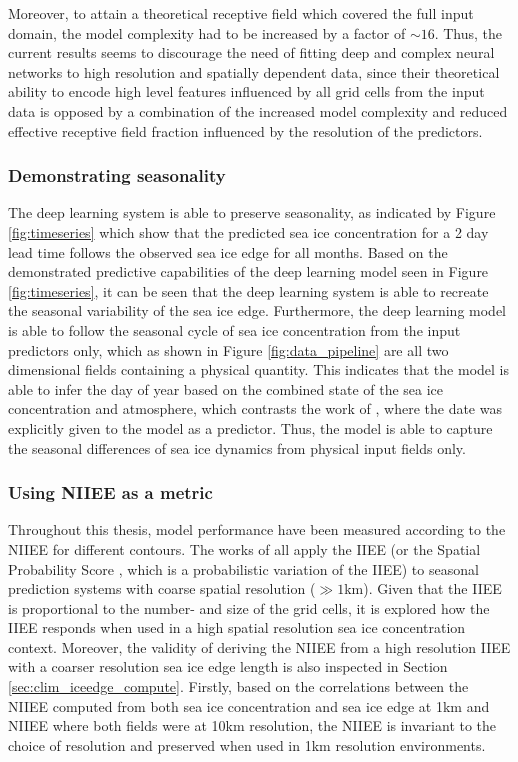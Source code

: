 \documentclass[../main/thesis]{subfiles}
\begin{document}
Moreover, to attain a theoretical receptive field which covered the full input domain, the model complexity had to be increased by a factor of $\sim 16$. Thus, the current results seems to discourage the need of fitting deep and complex neural networks to high resolution and spatially dependent data, since their theoretical ability to encode high level features influenced by all grid cells from the input data is opposed by a combination of the increased model complexity and reduced effective receptive field fraction influenced by the resolution of the predictors.

\subsubsection{Demonstrating seasonality}
\label{sec:demonstrate_seasonality}
The deep learning system is able to preserve seasonality, as indicated by Figure \ref{fig:timeseries} which show that the predicted sea ice concentration for a 2 day lead time follows the observed sea ice edge for all months. Based on the demonstrated predictive capabilities of the deep learning model seen in Figure \ref{fig:timeseries}, it can be seen that the deep learning system is able to recreate the seasonal variability of the sea ice edge. Furthermore, the deep learning model is able to follow the seasonal cycle of sea ice concentration from the input predictors only, which as shown in Figure \ref{fig:data_pipeline} are all two dimensional fields containing a physical quantity. This indicates that the model is able to infer the day of year based on the combined state of the sea ice concentration and atmosphere, which contrasts the work of \citet{Grigoryev2022}, where the date was explicitly given to the model as a predictor. Thus, the model is able to capture the seasonal differences of sea ice dynamics from physical input fields only.

\subsubsection{Using NIIEE as a metric}
Throughout this thesis, model performance have been measured according to the NIIEE \citep{Goessling2016, Melsom2019, Palerme2019, Zampieri2019} for different contours. The works of \citet{Goessling2016, Palerme2019, Zampieri2019} all apply the IIEE (or the Spatial Probability Score \citep{Goessling2018}, which is a probabilistic variation of the IIEE) to seasonal prediction systems with coarse spatial resolution ($\gg1$km). Given that the IIEE is proportional to the number- and size of the grid cells, it is explored how the IIEE responds when used in a high spatial resolution sea ice concentration context. Moreover, the validity of deriving the NIIEE from a high resolution IIEE with a coarser resolution sea ice edge length is also inspected in Section \ref{sec:clim_iceedge_compute}. Firstly, based on the correlations between the NIIEE computed from both sea ice concentration and sea ice edge at 1km and NIIEE where both fields were at 10km resolution, the NIIEE is invariant to the choice of resolution and preserved when used in 1km resolution environments.
\end{document}

